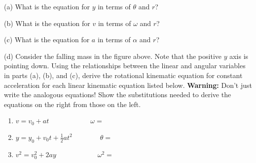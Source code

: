 (a) What is the equation for $y$ in terms of \( \theta  \) and $r$?
\vspace{7mm}

(b) What is the equation for $v$ in terms of \( \omega  \) and $r$?
\vspace{7mm}

(c) What is the equation for $a$ in terms of \( \alpha  \) and $r$?
\vspace{7mm}

(d) Consider the falling mass in the figure above. Note that the positive 
$y$ axis is pointing down. Using the 
relationships between the linear and angular variables in parts (a), (b), and 
(c), derive the rotational kinematic equation for constant acceleration for 
each linear kinematic equation listed below. \textbf{Warning:} Don't just write
the analogous equations! Show the substitutions needed to derive the equations
on the right from those on the left.

\begin{enumerate}
\item \( v=v_{0}+at\qquad \qquad \qquad \omega = \)
\vspace{20mm}

\item \( y=y_{0}+v_{0}t+\frac{1}{2}at^{2}\qquad \qquad \theta = \)
\vspace{20mm}

\item \( v^{2}=v_{0}^{2}+2ay\qquad \qquad \qquad \omega ^{2}= \)
\end{enumerate}
